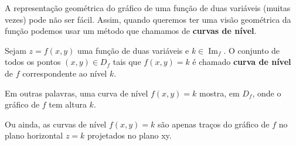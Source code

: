 A representação geométrica do gráfico de uma função de duas variáveis (muitas vezes) pode não ser fácil. Assim, quando queremos ter uma visão geométrica da função podemos usar um método que chamamos de \textbf{curvas de nível}.

\begin{definition}
    Sejam \(z = f(x,y)\) uma função de duas variáveis e \(k\in\operatorname{Im}_f\). O conjunto de todos os pontos \((x,y)\in D_f\) tais que \(f(x,y) = k\) é chamado \textbf{curva de nível} de \(f\) correspondente ao nível \(k\).
\end{definition}


Em outras palavras, uma curva de nível \(f(x,y) = k\) mostra, em \(D_f\), onde o gráfico de \(f\) tem altura \(k\).

Ou ainda, as curvas de nível \(f(x,y) = k\) são apenas traços do gráfico de \(f\) no plano horizontal \(z=k\) projetados no plano xy.


